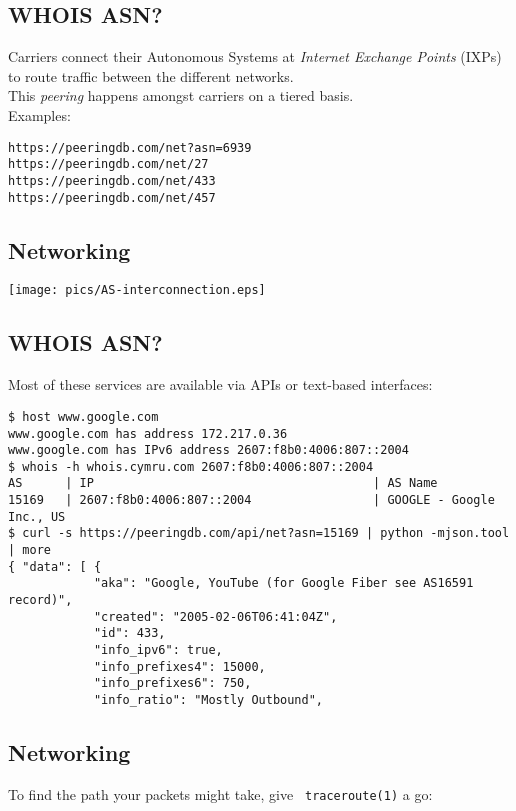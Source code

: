 \documentclass[xga]{xdvislides}
\begin{document}
\subsection{WHOIS ASN?}
Carriers connect their Autonomous Systems at {\em
Internet Exchange Points} (IXPs) to route traffic
between the different networks.\\

This {\em peering} happens amongst carriers on a
tiered basis. \\

Examples:
\begin{verbatim}
https://peeringdb.com/net?asn=6939
https://peeringdb.com/net/27
https://peeringdb.com/net/433
https://peeringdb.com/net/457
\end{verbatim}

\subsection{Networking}
\vspace*{\fill}
\begin{center}
	\texttt{[image: pics/AS-interconnection.eps]} \\
\end{center}
\vspace*{\fill}

\subsection{WHOIS ASN?}
Most of these services are available via APIs or
text-based interfaces:

\begin{verbatim}
$ host www.google.com
www.google.com has address 172.217.0.36
www.google.com has IPv6 address 2607:f8b0:4006:807::2004
$ whois -h whois.cymru.com 2607:f8b0:4006:807::2004
AS      | IP                                       | AS Name
15169   | 2607:f8b0:4006:807::2004                 | GOOGLE - Google Inc., US
$ curl -s https://peeringdb.com/api/net?asn=15169 | python -mjson.tool | more
{ "data": [ {
            "aka": "Google, YouTube (for Google Fiber see AS16591 record)",
            "created": "2005-02-06T06:41:04Z",
            "id": 433,
            "info_ipv6": true,
            "info_prefixes4": 15000,
            "info_prefixes6": 750,
            "info_ratio": "Mostly Outbound",
\end{verbatim}

\subsection{Networking}
To find the path your packets might take, give {\tt
traceroute(1)} a go: \\
\end{document}
